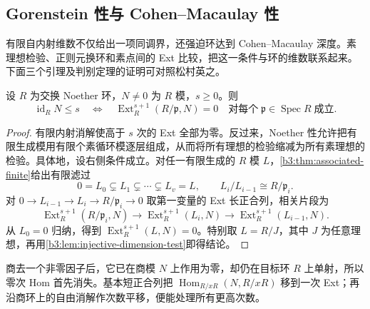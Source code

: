 \subsection{Gorenstein 性与 Cohen–Macaulay 性}
\label{b3:subsec:2203:02}

有限自内射维数不仅给出一项同调界，还强迫环达到 Cohen--Macaulay 深度。素理想检验、正则元换环和素点间的 Ext 比较，把这一条件与环的维数联系起来。下面三个引理及判别定理的证明可对照松村英之\cite[\S 18, Lemmas 1--4 and Theorem 18.1, pp. 139--144]{Matsumura1989CommutativeRingTheory}。

\begin{lemma}[内射维数的素理想检验]\label{b3:lem:injective-dimension-prime-test}
	设 \(R\) 为交换 Noether 环，\(N\ne0\) 为 \(R\) 模，\(s\ge0\)。则
	\[
		\operatorname{id}_RN\le s \quad\Longleftrightarrow\quad \operatorname{Ext}_R^{s+1}(R/\mathfrak p,N)=0 \quad\text{对每个}\;\mathfrak p\in\operatorname{Spec}R\;\text{成立}.
	\]
\end{lemma}
\begin{proof}
	有限内射消解使高于 \(s\) 次的 Ext 全部为零。反过来，Noether 性允许把有限生成模用有限个素循环模逐层组成，从而将所有理想的检验缩减为所有素理想的检验。具体地，设右侧条件成立。对任一有限生成的 \(R\) 模 \(L\)，\cref{b3:thm:associated-finite}给出有限滤过
	\[
		0=L_0\subsetneq L_1\subsetneq\cdots\subsetneq L_v=L, \qquad L_i/L_{i-1}\cong R/\mathfrak p_i.
	\]
	对 \(0\rightarrow L_{i-1}\rightarrow L_i\rightarrow R/\mathfrak p_i\rightarrow0\) 取第一变量的 Ext 长正合列，相关片段为
	\[
		\operatorname{Ext}_R^{s+1}(R/\mathfrak p_i,N) \longrightarrow\operatorname{Ext}_R^{s+1}(L_i,N) \longrightarrow\operatorname{Ext}_R^{s+1}(L_{i-1},N).
	\]
	从 \(L_0=0\) 归纳，得到 \(\operatorname{Ext}_R^{s+1}(L,N)=0\)。特别取 \(L=R/J\)，其中 \(J\) 为任意理想，再用\cref{b3:lem:injective-dimension-test}即得结论。
\end{proof}

商去一个非零因子后，它已在商模 \(N\) 上作用为零，却仍在目标环 \(R\) 上单射，所以零次 Hom 首先消失。基本短正合列把 \(\operatorname{Hom}_{R/xR}(N,R/xR)\) 移到一次 Ext；再沿商环上的自由消解作次数平移，便能处理所有更高次数。

